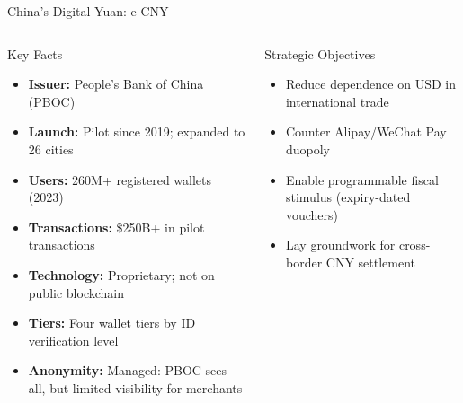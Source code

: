 \documentclass[8pt,aspectratio=169]{beamer}
\begin{document}
\begin{frame}{China's Digital Yuan: e-CNY}
\begin{columns}[T]
\begin{block}{Key Facts}
\begin{itemize}\setlength{\itemsep}{2pt}
  \item \textbf{Issuer:} People's Bank of China (PBOC)
  \item \textbf{Launch:} Pilot since 2019; expanded to 26 cities
  \item \textbf{Users:} 260M+ registered wallets (2023)
  \item \textbf{Transactions:} \$250B+ in pilot transactions
  \item \textbf{Technology:} Proprietary; not on public blockchain
  \item \textbf{Tiers:} Four wallet tiers by ID verification level
  \item \textbf{Anonymity:} Managed: PBOC sees all, but limited visibility for merchants
\end{itemize}
\end{block}
\vspace{2mm}
\begin{block}{Strategic Objectives}
\begin{itemize}\setlength{\itemsep}{2pt}
  \item Reduce dependence on USD in international trade
  \item Counter Alipay/WeChat Pay duopoly
  \item Enable programmable fiscal stimulus (expiry-dated vouchers)
  \item Lay groundwork for cross-border CNY settlement
\end{itemize}
\end{block}
\end{columns}
\end{frame}
\end{document}
